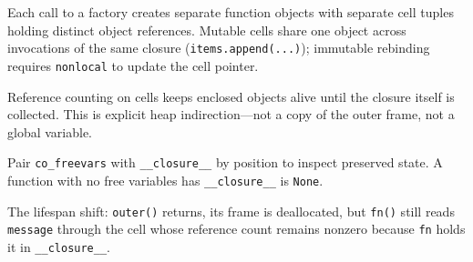 Each call to a factory creates separate function objects with separate cell tuples holding distinct object references. Mutable cells share one object across invocations of the same closure (\texttt{items.append(...)}); immutable rebinding requires \texttt{nonlocal} to update the cell pointer.

Reference counting on cells keeps enclosed objects alive until the closure itself is collected. This is explicit heap indirection---not a copy of the outer frame, not a global variable.

Pair \texttt{co\_freevars} with \texttt{\_\_closure\_\_} by position to inspect preserved state. A function with no free variables has \texttt{\_\_closure\_\_} is \texttt{None}.

The lifespan shift: \texttt{outer()} returns, its frame is deallocated, but \texttt{fn()} still reads \texttt{message} through the cell whose reference count remains nonzero because \texttt{fn} holds it in \texttt{\_\_closure\_\_}.
